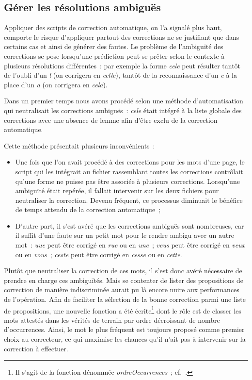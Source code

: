\documentclass[a4paper,12pt,twoside]{book}
\begin{document}
			\subsection{Gérer les résolutions ambiguës}
				Appliquer des scripts de correction automatique, on l'a signalé plus haut, comporte le risque d'appliquer partout des corrections ne se justifiant que dans certains cas et ainsi de générer des fautes. Le problème de l'ambiguïté des corrections se pose lorsqu'une prédiction peut se prêter selon le contexte à plusieurs résolutions différentes~: par exemple la forme \textit{cele} peut résulter tantôt de l'oubli d'un \textit{l} (on corrigera en \textit{celle}), tantôt de la reconnaissance d'un \textit{e} à la place d'un \textit{a} (on corrigera en \textit{cela}).
							
				Dans un premier temps nous avons procédé selon une méthode d'automatisation qui neutralisait les corrections ambiguës~: \textit{cele} était intégré à la liste globale des corrections avec une absence de lemme afin d'être exclu de la correction automatique.
				
				Cette méthode présentait plusieurs inconvénients~:

				\begin{itemize}
					\item Une fois que l'on avait procédé à des corrections pour les mots d'une page, le script qui les intégrait au fichier rassemblant toutes les corrections contrôlait qu'une forme ne puisse pas être associée à plusieurs corrections. Lorsqu'une ambiguïté était repérée, il fallait intervenir sur les deux fichiers pour neutraliser la correction. Devenu fréquent, ce processus diminuait le bénéfice de temps attendu de la correction automatique~;

					\item D'autre part, il s'est avéré que les corrections ambiguës sont nombreuses, car il suffit d'une faute sur un petit mot pour le rendre ambigu avec un autre mot~: \textit{uue} peut être corrigé en \textit{rue} ou en \textit{une}~; \textit{veus} peut être corrigé en \textit{veux} ou en \textit{vous}~; \textit{ceste} peut être corrigé en \textit{cesse} ou en \textit{cette}.
				
				\end{itemize}
				
				Plutôt que neutraliser la correction de ces mots, il s'est donc avéré nécessaire de prendre en charge ces ambiguïtés. Mais se contenter de lister des propositions de correction de manière indiscriminée aurait pu là encore nuire aux performances de l'opération. Afin de faciliter la sélection de la bonne correction parmi une liste de propositions, une nouvelle fonction a été écrite\footnote{Il s'agit de la fonction dénommée \textit{ordreOccurrences}~; cf.~\cite{biaySpellcheckTextsPy2022}.} dont le rôle est de classer les mots attestés dans les vérités de terrain par ordre décroissant de nombre d'occurrences. Ainsi, le mot le plus fréquent est toujours proposé comme premier choix au correcteur, ce qui maximise les chances qu'il n'ait pas à intervenir sur la correction à effectuer.
			
\end{document}
